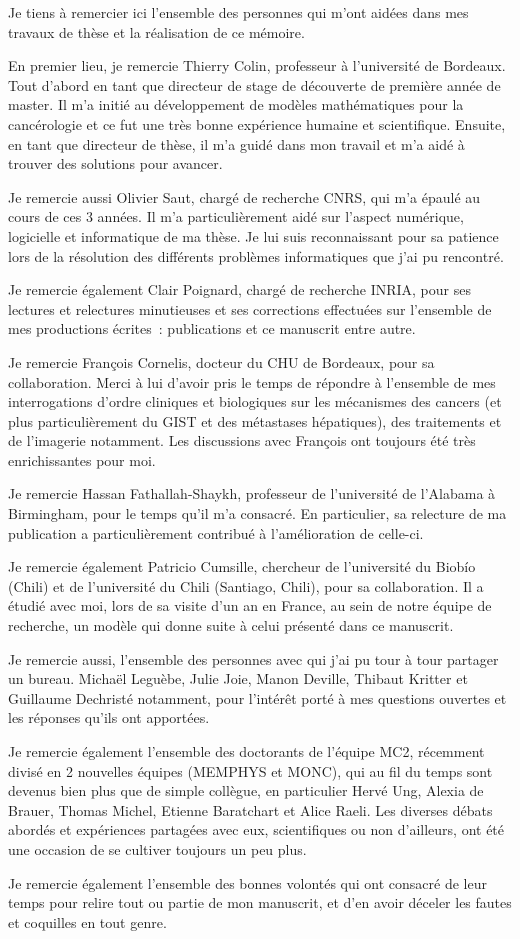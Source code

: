 Je tiens à remercier ici  l'ensemble des personnes qui m'ont aidées dans mes travaux de thèse et la réalisation de ce mémoire.

En premier lieu, je remercie Thierry Colin, professeur à l'université de Bordeaux. Tout d'abord en tant que directeur de stage de découverte de première année de master. Il m'a initié au développement de modèles mathématiques pour la cancérologie et ce fut une très bonne expérience humaine et scientifique. Ensuite, en tant que directeur de thèse, il m'a guidé dans mon travail et m'a aidé à trouver des solutions pour avancer. 

Je remercie aussi Olivier Saut, chargé de recherche CNRS, qui m'a épaulé au cours de ces 3 années. Il m'a particulièrement aidé sur l'aspect numérique, logicielle et informatique de ma thèse. Je lui suis reconnaissant pour sa patience lors de la résolution des différents problèmes informatiques que j'ai pu rencontré. 

Je remercie également Clair Poignard, chargé de recherche INRIA, pour ses lectures et relectures minutieuses et ses corrections effectuées sur l'ensemble de mes productions écrites~: publications et ce manuscrit entre autre.

Je remercie François Cornelis, docteur du CHU de Bordeaux, pour sa collaboration. Merci à lui d'avoir pris le temps de répondre à l'ensemble de mes interrogations d'ordre cliniques et biologiques sur les mécanismes des cancers (et plus particulièrement du GIST et des métastases hépatiques), des traitements et de l'imagerie notamment. Les discussions avec François ont toujours été très enrichissantes pour moi. 

Je remercie Hassan Fathallah-Shaykh, professeur de l'université de l'Alabama à Birmingham, pour le temps qu'il m'a consacré. En particulier, sa relecture de ma publication a particulièrement contribué  à l'amélioration de celle-ci.

Je remercie également Patricio Cumsille, chercheur de l'université du Biobío (Chili) et de l'université du Chili (Santiago, Chili), pour sa collaboration. Il a étudié avec moi, lors de sa visite d'un an en France, au sein de notre équipe de recherche, un modèle qui donne suite à celui présenté dans ce manuscrit. 

Je remercie aussi, l'ensemble des personnes avec qui j'ai pu tour à tour partager un bureau. Michaël Leguèbe, Julie Joie, Manon Deville, Thibaut Kritter et Guillaume Dechristé notamment, pour l'intérêt porté à mes questions ouvertes et les réponses qu'ils ont apportées.

Je remercie également l'ensemble des doctorants de l'équipe MC2, récemment divisé en 2 nouvelles équipes (MEMPHYS et MONC), qui au fil du temps sont devenus bien plus que de simple collègue, en particulier Hervé Ung, Alexia de Brauer, Thomas Michel, Etienne Baratchart et Alice Raeli. Les diverses débats abordés et expériences partagées avec eux, scientifiques ou non d'ailleurs, ont été une occasion de se cultiver toujours un peu plus.

Je remercie également l'ensemble des bonnes volontés qui ont consacré de leur temps pour relire tout ou partie de mon manuscrit, et d'en avoir déceler les fautes et coquilles en tout genre. 
